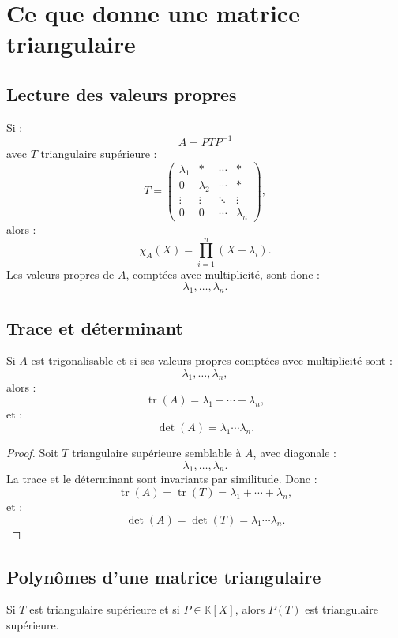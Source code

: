 \documentclass[11pt,a4paper]{article}
\newcommand{\K}{\mathbb K}
\newcommand{\tr}{\operatorname{tr}}
\begin{document}
\section{Ce que donne une matrice triangulaire}

\subsection{Lecture des valeurs propres}

Si :
\[
A=PTP^{-1}
\]
avec \(T\) triangulaire supérieure :
\[
T=
\begin{pmatrix}
\lambda_1&*&\cdots&*\\
0&\lambda_2&\cdots&*\\
\vdots&\vdots&\ddots&\vdots\\
0&0&\cdots&\lambda_n
\end{pmatrix},
\]
alors :
\[
\chi_A(X)=\prod_{i=1}^n(X-\lambda_i).
\]
Les valeurs propres de \(A\), comptées avec multiplicité, sont donc :
\[
\lambda_1,\dots,\lambda_n.
\]

\subsection{Trace et déterminant}

\begin{theorembox}
Si \(A\) est trigonalisable et si ses valeurs propres comptées avec multiplicité sont :
\[
\lambda_1,\dots,\lambda_n,
\]
alors :
\[
\tr(A)=\lambda_1+\cdots+\lambda_n,
\]
et :
\[
\det(A)=\lambda_1\cdots\lambda_n.
\]
\end{theorembox}

\begin{proof}
Soit \(T\) triangulaire supérieure semblable à \(A\), avec diagonale :
\[
\lambda_1,\dots,\lambda_n.
\]
La trace et le déterminant sont invariants par similitude.  
Donc :
\[
\tr(A)=\tr(T)=\lambda_1+\cdots+\lambda_n,
\]
et :
\[
\det(A)=\det(T)=\lambda_1\cdots\lambda_n.
\]
\end{proof}

\subsection{Polynômes d'une matrice triangulaire}

\begin{theorembox}
Si \(T\) est triangulaire supérieure et si \(P\in\K[X]\), alors \(P(T)\) est triangulaire supérieure.
\end{theorembox}
\end{document}

